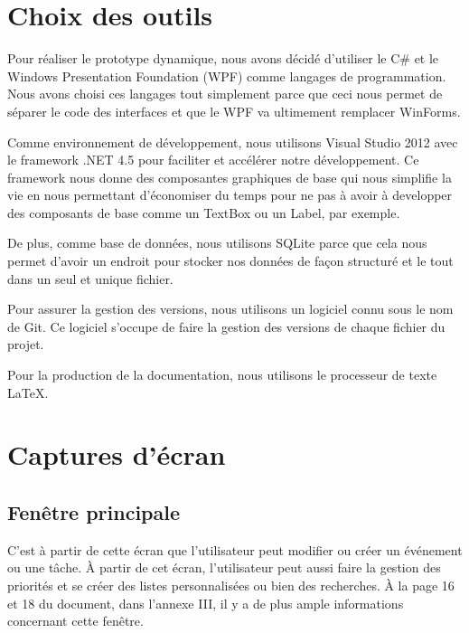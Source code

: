\documentclass[letterpaper, oneside, 12pt, these, creativecommons]{thETS}
\begin{document}
\section{Choix des outils}

Pour réaliser le prototype dynamique, nous avons décidé d'utiliser le C\# et le Windows Presentation Foundation (WPF) comme langages de programmation. Nous avons choisi ces langages tout simplement parce que ceci nous permet de séparer le code des interfaces et que le WPF va ultimement remplacer WinForms. 

Comme environnement de développement, nous utilisons Visual Studio 2012 avec le framework .NET 4.5 pour faciliter et accélérer notre développement. Ce framework nous donne des composantes graphiques de base qui nous simplifie la vie en nous permettant d'économiser du temps pour ne pas à avoir à developper des composants de base comme un TextBox ou un Label, par exemple.

De plus, comme base de données, nous utilisons SQLite parce que cela nous permet d'avoir un endroit pour stocker nos données de façon structuré et le tout dans un seul et unique fichier.

Pour assurer la gestion des versions, nous utilisons un logiciel connu sous le nom de Git. Ce logiciel s'occupe de faire la gestion des versions de chaque fichier du projet.

Pour la production de la documentation, nous utilisons le processeur de texte \LaTeX.

\newpage

\section{Captures d'écran}

\subsection{Fenêtre principale}

C'est à partir de cette écran que l'utilisateur peut modifier ou créer un événement ou une tâche. À partir de cet écran, l'utilisateur peut aussi faire la gestion des priorités et se créer des listes personnalisées ou bien des recherches. À la page 16 et 18 du document, dans l'annexe III, il y a de plus ample informations concernant cette fenêtre.
\end{document}
